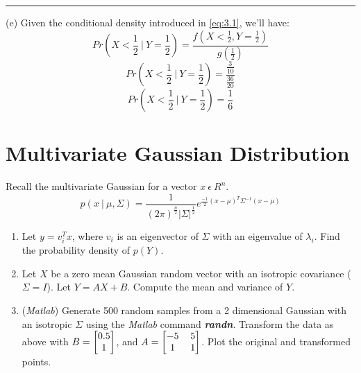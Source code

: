 \documentclass[12pt]{article}
\numberwithin{equation}{section}
\numberwithin{table}{section}
\numberwithin{figure}{section}
\begin{document}
\noindent\rule{\textwidth}{.5pt}
(e) Given the conditional density introduced in \ref{eq:3.1}, we'll have:
$$
	Pr(X < \frac{1}{2}\ |\ Y = \frac{1}{2}) = \frac{f(X < \frac{1}{2}, Y = \frac{1}{2})}{g(\frac{1}{2})}
$$
$$
	Pr(X < \frac{1}{2}\ |\ Y = \frac{1}{2}) = \frac{\frac{3}{10}}{\frac{36}{20}}
$$
$$
	Pr(X < \frac{1}{2}\ |\ Y = \frac{1}{2}) = \frac{1}{6}
$$

\section{Multivariate Gaussian Distribution}
Recall the multivariate Gaussian for a vector $x\ \epsilon\ R^n$.
\begin{equation}\label{eq:4.1}
	p(x\ |\ \mu, \Sigma) = \frac{1}{(2\pi)^\frac{n}{2}|\Sigma|^\frac{1}{2}} e^{\frac{-1}{2}(x - \mu)^T\Sigma^{-1}(x - \mu)} 
\end{equation}

\begin{enumerate}[label=(\alph*)]
	\item Let $y=v_i^Tx$, where $v_i$ is an eigenvector of $\Sigma$ with an eigenvalue of $\lambda_i$. Find the probability density of $p(Y)$.
	
	\item Let $X$ be a zero mean Gaussian random vector with an isotropic covariance ($\Sigma  = I$). Let $Y = AX + B$. Compute the mean and variance of $Y$.
	
	\item (\textit{Matlab}) Generate 500 random samples from a 2 dimensional Gaussian with an isotropic $\Sigma$ using the \textit{Matlab} command \textit{\textbf{randn}}. Transform the data as above with
	$
	B = 
	\renewcommand\arraystretch{1}
	\setlength\arraycolsep{6pt}
	\begin{bmatrix}
	0.5 \\
	1 \\
	\end{bmatrix}
	$, and $
	A = 
	\renewcommand\arraystretch{1}
	\setlength\arraycolsep{6pt}
	\begin{bmatrix}
	-5 & 5 \\
	1 & 1 \\
	\end{bmatrix}
	$. Plot the original and transformed points.
	
\end{enumerate}
\end{document}
